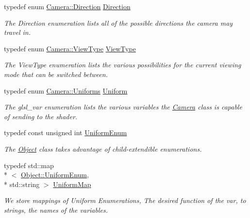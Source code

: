 \begin{DoxyCompactItemize}
typedef enum \hyperlink{class_camera_a80cb65605322d27ad3b6d973484509ec}{Camera\-::\-Direction} \hyperlink{class_camera_a94bb7ceb1c7a05e54cf638924f228baf}{Direction}
\begin{DoxyCompactList}\small\item\em The Direction enumeration lists all of the possible directions the camera may travel in. \end{DoxyCompactList}\item 
typedef enum \hyperlink{class_camera_aaa256acd50a2fa143d9f8d9456e2802f}{Camera\-::\-View\-Type} \hyperlink{class_camera_a5b2dc5eaed6cbaabee0eea3f2714acd7}{View\-Type}
\begin{DoxyCompactList}\small\item\em The View\-Type enumeration lists the various possibilities for the current viewing mode that can be switched between. \end{DoxyCompactList}\item 
typedef enum \hyperlink{class_camera_a630738fd23098d44c0d15ee28d5649dd}{Camera\-::\-Uniforms} \hyperlink{class_camera_a0ed19c96505cbb70625938d1e883af24}{Uniform}
\begin{DoxyCompactList}\small\item\em The glsl\-\_\-var enumeration lists the various variables the \hyperlink{class_camera}{Camera} class is capable of sending to the shader. \end{DoxyCompactList}\item 
typedef const unsigned int \hyperlink{class_object_a79b74057dbc5182b85c9c3ba8480fcf2}{Uniform\-Enum}
\begin{DoxyCompactList}\small\item\em The \hyperlink{class_object}{Object} class takes advantage of child-\/extendible enumerations. \end{DoxyCompactList}\item 
typedef std\-::map\\*
$<$ \hyperlink{class_object_a79b74057dbc5182b85c9c3ba8480fcf2}{Object\-::\-Uniform\-Enum}, \\*
std\-::string $>$ \hyperlink{class_object_a6e19bd8516360bff956408cbae33b878}{Uniform\-Map}
\begin{DoxyCompactList}\small\item\em We store mappings of Uniform Enumerations, The desired function of the var, to strings, the names of the variables. \end{DoxyCompactList}\end{DoxyCompactItemize}
